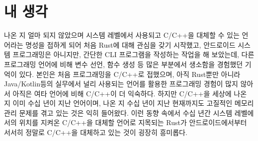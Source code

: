 \documentclass{article}
\begin{document}
\section{내 생각}
나온 지 얼마 되지 않았으며 시스템 레벨에서 사용되고 C/C++을 대체할 수 있는 언어라는 명성을 접하게 되어 처음 Rust에 대해 관심을 갖기 시작했고, 안드로이드 시스템 프로그래밍은 아니지만, 간단한 CLI 프로그램을 작성하는 작업을 해 보았는데, 다른 프로그래밍 언어에 비해 변수 선언, 함수 생성 등 많은 부분에서 생소함을 경험했던 기억이 있다. 본인은 처음 프로그래밍을 C/C++로 접했으며, 아직 Rust뿐만 아니라 Java/Kotlin등의 실무에서 널리 사용되는 언어를 활용한 프로그래밍 경험이 많지 않아서 아직은 여타 언어에 비해 C/C++이 더 익숙하다. 하지만 C/C++을 세상에 나온 지 이미 수십 년이 지난 언어이며, 나온 지 수십 년이 지난 현재까지도 고질적인 메모리 관리 문제를 겪고 있는 것은 익히 들어왔다. 이런 동향 속에서 수십 년간 시스템 레벨에서의 위치를 지켜온 C/C++을 대체할 언어로 지목되는 Rust가 안드로이드에서부터 서서히 정말로 C/C++을 대체하고 있는 것이 굉장히 흥미롭다.
\end{document}
